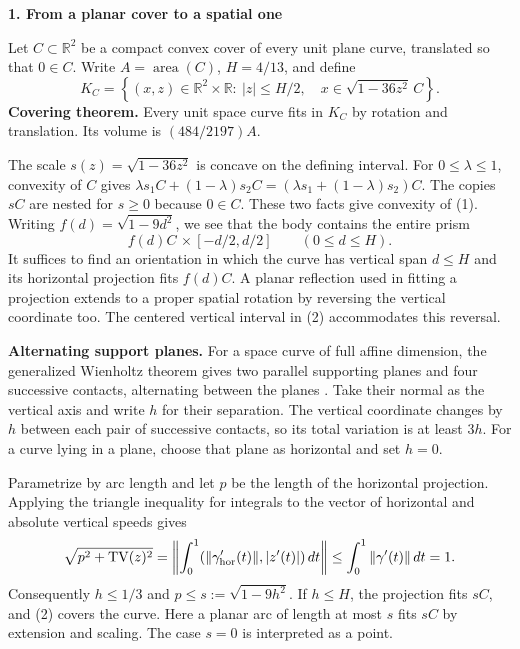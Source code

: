 \documentclass[11pt,letterpaper]{article}
\newcommand{\heading}[1]{{\large\sffamily\bfseries\color{ink}#1}\par\smallskip}
\newcommand{\term}[1]{\textbf{\color{ink}#1}}
\newcommand{\R}{\mathbb R}
\DeclareMathOperator{\area}{area}
\DeclareMathOperator{\TV}{TV}
\begin{document}
\newpage
\fontsize{12}{15.6}\selectfont
\heading{1. From a planar cover to a spatial one}
Let \(C\subset\R^2\) be a compact convex cover of every unit plane curve, translated so that \(0\in C\). Write \(A=\area(C)\), \(H=4/13\), and define
\begin{equation}
K_C=\left\{(x,z)\in\R^2\times\R:\ |z|\le H/2,\quad
 x\in\sqrt{1-36z^2}\,C\right\}.
\tag{1}
\end{equation}
\term{Covering theorem.} Every unit space curve fits in \(K_C\) by rotation and translation. Its volume is \((484/2197)A\).

The scale \(s(z)=\sqrt{1-36z^2}\) is concave on the defining interval. For \(0\le\lambda\le1\), convexity of \(C\) gives
\(\lambda s_1 C+(1-\lambda)s_2 C=(\lambda s_1+(1-\lambda)s_2)C\).
The copies \(sC\) are nested for \(s\ge0\) because \(0\in C\). These two facts give convexity of (1). Writing \(f(d)=\sqrt{1-9d^2}\), we see that the body contains the entire prism
\begin{equation}
f(d)C\,\times [-d/2,d/2]\qquad (0\le d\le H).
\tag{2}
\end{equation}
It suffices to find an orientation in which the curve has vertical span \(d\le H\) and its horizontal projection fits \(f(d)C\). A planar reflection used in fitting a projection extends to a proper spatial rotation by reversing the vertical coordinate too. The centered vertical interval in (2) accommodates this reversal.

\term{Alternating support planes.} For a space curve of full affine dimension, the generalized Wienholtz theorem gives two parallel supporting planes and four successive contacts, alternating between the planes \cite[Corollary 3.2]{Ghomi}. Take their normal as the vertical axis and write \(h\) for their separation. The vertical coordinate changes by \(h\) between each pair of successive contacts, so its total variation is at least \(3h\). For a curve lying in a plane, choose that plane as horizontal and set \(h=0\).

Parametrize by arc length and let \(p\) be the length of the horizontal projection. Applying the triangle inequality for integrals to the vector of horizontal and absolute vertical speeds gives
\[
\sqrt{p^2+\TV(z)^2}
=\left\|\int_0^1 (\|\gamma'_{\rm hor}(t)\|,|z'(t)|)\,dt\right\|
\le\int_0^1\|\gamma'(t)\|\,dt=1.
\]
Consequently \(h\le1/3\) and \(p\le s:=\sqrt{1-9h^2}\). If \(h\le H\), the projection fits \(sC\), and (2) covers the curve. Here a planar arc of length at most \(s\) fits \(sC\) by extension and scaling. The case \(s=0\) is interpreted as a point.
\end{document}
